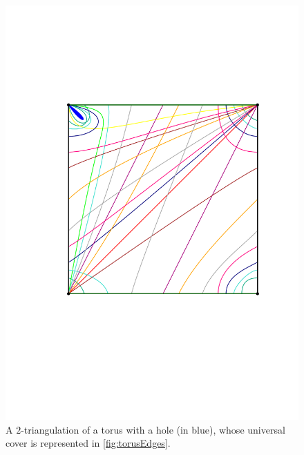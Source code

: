 \documentclass{amsart}
\theoremstyle{remark}
\begin{document}
\begin{figure}[b]
	\capstart
	\centerline{\includegraphics[scale=.42]{exTorusSquare}}
	\caption{A $2$-triangulation of a torus with a hole (in blue), whose universal cover is represented in \cref{fig:torusEdges}.}
	\label{fig:torus}
\end{figure}
\end{document}
